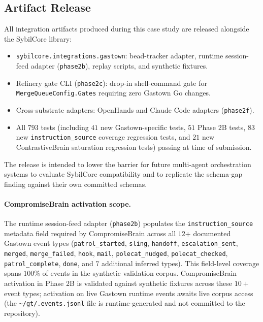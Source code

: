 \subsection{Artifact Release}
\label{sec:gastown:artifacts}

All integration artifacts produced during this case study are released
alongside the SybilCore library:
\begin{itemize}[noitemsep]
\item \texttt{sybilcore.integrations.gastown}: bead-tracker adapter,
  runtime session-feed adapter (\texttt{phase2b}), replay scripts, and
  synthetic fixtures.
\item Refinery gate CLI (\texttt{phase2c}): drop-in shell-command gate for
  \texttt{MergeQueueConfig.Gates} requiring zero Gastown Go changes.
\item Cross-substrate adapters: OpenHands and Claude Code adapters
  (\texttt{phase2f}).
\item All $793$ tests (including $41$ new Gastown-specific tests, $51$
  Phase 2B tests, $83$ new \texttt{instruction\_source} coverage
  regression tests, and $21$ new ContrastiveBrain saturation regression
  tests) passing at time of submission.
\end{itemize}
The release is intended to lower the barrier for future multi-agent
orchestration systems to evaluate SybilCore compatibility and to replicate
the schema-gap finding against their own committed schemas.

\paragraph{CompromiseBrain activation scope.}
The runtime session-feed adapter (\texttt{phase2b}) populates the
\texttt{instruction\_source} metadata field required by CompromiseBrain
across all $12$+ documented Gastown event types (\texttt{patrol\_started},
\texttt{sling}, \texttt{handoff}, \texttt{escalation\_sent},
\texttt{merged}, \texttt{merge\_failed}, \texttt{hook}, \texttt{mail},
\texttt{polecat\_nudged}, \texttt{polecat\_checked}, \texttt{patrol\_complete},
\texttt{done}, and $7$ additional inferred types). This field-level coverage
spans $100\%$ of events in the synthetic validation corpus. CompromiseBrain
activation in Phase 2B is validated against synthetic fixtures across these
$10+$ event types; activation on live Gastown runtime events awaits live corpus
access (the \texttt{\textasciitilde/gt/.events.jsonl} file is runtime-generated
and not committed to the repository).